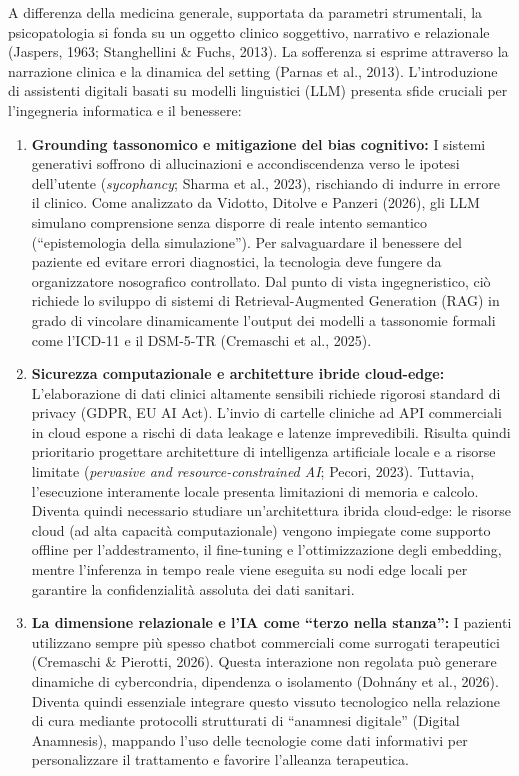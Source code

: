 \documentclass[11pt,a4paper]{article}
\begin{document}
A differenza della medicina generale, supportata da parametri strumentali, la psicopatologia si fonda su un oggetto clinico soggettivo, narrativo e relazionale (Jaspers, 1963; Stanghellini \& Fuchs, 2013). La sofferenza si esprime attraverso la narrazione clinica e la dinamica del setting (Parnas et al., 2013). L'introduzione di assistenti digitali basati su modelli linguistici (LLM) presenta sfide cruciali per l'ingegneria informatica e il benessere:

\begin{enumerate}[label=\alph*)]
    \item \textbf{Grounding tassonomico e mitigazione del bias cognitivo:} I sistemi generativi soffrono di allucinazioni e accondiscendenza verso le ipotesi dell'utente (\textit{sycophancy}; Sharma et al., 2023), rischiando di indurre in errore il clinico. Come analizzato da Vidotto, Ditolve e Panzeri (2026), gli LLM simulano comprensione senza disporre di reale intento semantico (``epistemologia della simulazione''). Per salvaguardare il benessere del paziente ed evitare errori diagnostici, la tecnologia deve fungere da organizzatore nosografico controllato. Dal punto di vista ingegneristico, ciò richiede lo sviluppo di sistemi di Retrieval-Augmented Generation (RAG) in grado di vincolare dinamicamente l'output dei modelli a tassonomie formali come l'ICD-11 e il DSM-5-TR (Cremaschi et al., 2025).
    
    \item \textbf{Sicurezza computazionale e architetture ibride cloud-edge:} L'elaborazione di dati clinici altamente sensibili richiede rigorosi standard di privacy (GDPR, EU AI Act). L'invio di cartelle cliniche ad API commerciali in cloud espone a rischi di data leakage e latenze imprevedibili. Risulta quindi prioritario progettare architetture di intelligenza artificiale locale e a risorse limitate (\textit{pervasive and resource-constrained AI}; Pecori, 2023). Tuttavia, l'esecuzione interamente locale presenta limitazioni di memoria e calcolo. Diventa quindi necessario studiare un'architettura ibrida cloud-edge: le risorse cloud (ad alta capacità computazionale) vengono impiegate come supporto offline per l'addestramento, il fine-tuning e l'ottimizzazione degli embedding, mentre l'inferenza in tempo reale viene eseguita su nodi edge locali per garantire la confidenzialità assoluta dei dati sanitari.
    
    \item \textbf{La dimensione relazionale e l'IA come ``terzo nella stanza'':} I pazienti utilizzano sempre più spesso chatbot commerciali come surrogati terapeutici (Cremaschi \& Pierotti, 2026). Questa interazione non regolata può generare dinamiche di cybercondria, dipendenza o isolamento (Dohnány et al., 2026). Diventa quindi essenziale integrare questo vissuto tecnologico nella relazione di cura mediante protocolli strutturati di ``anamnesi digitale'' (Digital Anamnesis), mappando l'uso delle tecnologie come dati informativi per personalizzare il trattamento e favorire l'alleanza terapeutica.
\end{enumerate}
\end{document}
